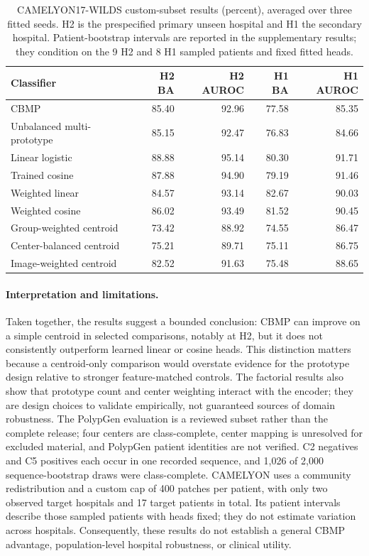 \begin{table}[t]
\centering\small
\setlength{\tabcolsep}{5pt}
\begin{tabular}{lrrrr}
\hline
Classifier & H2 BA & H2 AUROC & H1 BA & H1 AUROC \\
\hline
CBMP & 85.40 & 92.96 & 77.58 & 85.35 \\
Unbalanced multi-prototype & 85.15 & 92.47 & 76.83 & 84.66 \\
Linear logistic & 88.88 & 95.14 & 80.30 & 91.71 \\
Trained cosine & 87.88 & 94.90 & 79.19 & 91.46 \\
Weighted linear & 84.57 & 93.14 & 82.67 & 90.03 \\
Weighted cosine & 86.02 & 93.49 & 81.52 & 90.45 \\
Group-weighted centroid & 73.42 & 88.92 & 74.55 & 86.47 \\
Center-balanced centroid & 75.21 & 89.71 & 75.11 & 86.75 \\
Image-weighted centroid & 82.52 & 91.63 & 75.48 & 88.65 \\
\hline
\end{tabular}
\caption{CAMELYON17-WILDS custom-subset results (percent), averaged over three fitted seeds. H2 is the prespecified primary unseen hospital and H1 the secondary hospital. Patient-bootstrap intervals are reported in the supplementary results; they condition on the 9 H2 and 8 H1 sampled patients and fixed fitted heads.}
\label{tab:camelyon_results}
\end{table}

\paragraph{Interpretation and limitations.}
Taken together, the results suggest a bounded conclusion: CBMP can improve on a simple centroid in selected comparisons, notably at H2, but it does not consistently outperform learned linear or cosine heads. This distinction matters because a centroid-only comparison would overstate evidence for the prototype design relative to stronger feature-matched controls. The factorial results also show that prototype count and center weighting interact with the encoder; they are design choices to validate empirically, not guaranteed sources of domain robustness. The PolypGen evaluation is a reviewed subset rather than the complete release; four centers are class-complete, center mapping is unresolved for excluded material, and PolypGen patient identities are not verified. C2 negatives and C5 positives each occur in one recorded sequence, and 1,026 of 2,000 sequence-bootstrap draws were class-complete. CAMELYON uses a community redistribution and a custom cap of 400 patches per patient, with only two observed target hospitals and 17 target patients in total. Its patient intervals describe those sampled patients with heads fixed; they do not estimate variation across hospitals. Consequently, these results do not establish a general CBMP advantage, population-level hospital robustness, or clinical utility.
